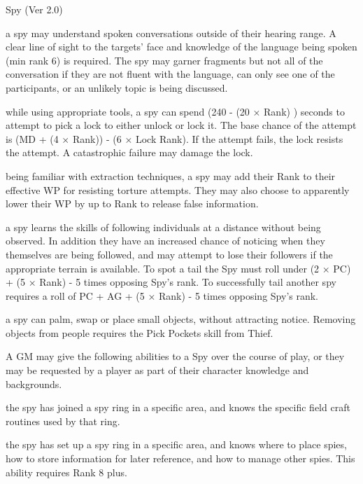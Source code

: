 \begin{Chapter}{Spy (Ver 2.0)}
\begin{Description}
\item[Lip Reading] a spy may understand spoken conversations outside
  of their hearing range.  A clear line of sight to the targets’ face
  and knowledge of the language being spoken (min rank 6) is required.
  The spy may garner fragments but not all of the conversation if they
  are not fluent with the language, can only see one of the
  participants, or an unlikely topic is being discussed.

\item[Pick Locks] while using appropriate tools, a spy can spend (240
  - (20 × Rank) ) seconds to attempt to pick a lock to either unlock
  or lock it. The base chance of the attempt is (MD + (4 × Rank)) - (6
  × Lock Rank). If the attempt fails, the lock resists the attempt.  A
  catastrophic failure may damage the lock.

\item[Resist Torture] being familiar with extraction techniques, a spy
  may add their Rank to their effective WP for resisting torture
  attempts.  They may also choose to apparently lower their WP by up
  to Rank to release false information.

\item[Shadowing] a spy learns the skills of following individuals at a
  distance without being observed. In addition they have an increased
  chance of noticing when they themselves are being followed, and may
  attempt to lose their followers if the appropriate terrain is
  available. To spot a tail the Spy must roll under (2 × PC) + (5 ×
  Rank) - 5 times opposing Spy’s rank.  To successfully tail another
  spy requires a roll of PC + AG + (5 × Rank) - 5 times opposing Spy’s
  rank.

\item[Sleight of Hand] a spy can palm, swap or place small objects,
  without attracting notice.  Removing objects from people requires
  the Pick Pockets skill from Thief.
\end{Description}

A GM may give the following abilities to a Spy over the course of
play, or they may be requested by a player as part of their character
knowledge and backgrounds.

\begin{Description}

\item[Network (area)] the spy has joined a spy ring in a specific
  area, and knows the specific field craft routines used by that ring.

\item[Spy Master (area)] the spy has set up a spy ring in a specific
  area, and knows where to place spies, how to store information for
  later reference, and how to manage other spies.  This ability
  requires Rank 8 plus.

\end{Description}

\end{Chapter}
